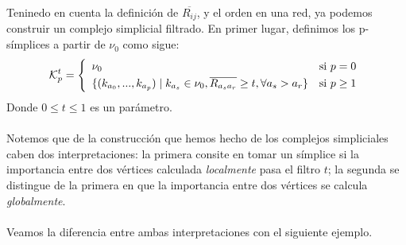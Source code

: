 \documentclass[12pt]{article}
\numberwithin{equation}{section}
\theoremstyle{definition}
\theoremstyle{remark}
\theoremstyle{plain}
\begin{document}
		Teninedo en cuenta la definición de $\overline{R_{ij}}$, y el orden en una red, ya podemos construir un complejo simplicial filtrado. 
		En primer lugar, definimos los p-símplices a partir de {\Large $\nu$}$_{0}$ como sigue:
		\begin{equation}
           		\mathcal{K}_{p}^{t}=
			\left \{
				\begin{array}{ll}
					{\Large \nu}_{0} & \text{si } p=0\\[3pt]
            				\{(k_{a_{0}},...,k_{a_{p}}) \mid k_{a_{s}} \in {\Large \nu}_{0}, \overline{R_{a_{s}a_{r}}} \geq t, 
					\forall a_{s} > a_{r} \} & \text{si } p \geq 1
				\end{array}
            		\right.  
			\label{def:sn}
        	\end{equation}
		Donde $0 \leq t \leq 1$ es un parámetro. \\
		\\
		Notemos que de la construcción que hemos hecho de los complejos simpliciales caben dos interpretaciones: la primera consite en tomar 
		un símplice si la importancia entre dos vértices calculada \emph{localmente} pasa el filtro $t$; la segunda se distingue 
		de la primera en que la importancia entre dos vértices se calcula \emph{globalmente}.\\
		\\
		Veamos la diferencia entre ambas interpretaciones con el siguiente ejemplo.
\end{document}
